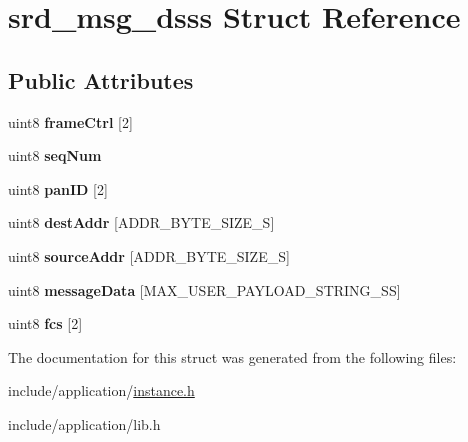 \hypertarget{structsrd__msg__dsss}{\section{srd\-\_\-msg\-\_\-dsss Struct Reference}
\label{structsrd__msg__dsss}
}
\subsection*{Public Attributes}
\begin{DoxyCompactItemize}
\item 
\hypertarget{structsrd__msg__dsss_aa8fe4f53ba63c69f62c8fb192f2786b4}{uint8 {\bfseries frame\-Ctrl} \mbox{[}2\mbox{]}}\label{structsrd__msg__dsss_aa8fe4f53ba63c69f62c8fb192f2786b4}

\item 
\hypertarget{structsrd__msg__dsss_a2bba6cb6f1eb110ee81204360e464139}{uint8 {\bfseries seq\-Num}}\label{structsrd__msg__dsss_a2bba6cb6f1eb110ee81204360e464139}

\item 
\hypertarget{structsrd__msg__dsss_a46eb7c581c5e39851590acfc0de65780}{uint8 {\bfseries pan\-I\-D} \mbox{[}2\mbox{]}}\label{structsrd__msg__dsss_a46eb7c581c5e39851590acfc0de65780}

\item 
\hypertarget{structsrd__msg__dsss_adea3cebad18e8b1c03828c67465577ba}{uint8 {\bfseries dest\-Addr} \mbox{[}A\-D\-D\-R\-\_\-\-B\-Y\-T\-E\-\_\-\-S\-I\-Z\-E\-\_\-\-S\mbox{]}}\label{structsrd__msg__dsss_adea3cebad18e8b1c03828c67465577ba}

\item 
\hypertarget{structsrd__msg__dsss_a4f0e2765b0052f0bb4cb81183cea453d}{uint8 {\bfseries source\-Addr} \mbox{[}A\-D\-D\-R\-\_\-\-B\-Y\-T\-E\-\_\-\-S\-I\-Z\-E\-\_\-\-S\mbox{]}}\label{structsrd__msg__dsss_a4f0e2765b0052f0bb4cb81183cea453d}

\item 
\hypertarget{structsrd__msg__dsss_ad79cad0d5570f8197185866b23f7e099}{uint8 {\bfseries message\-Data} \mbox{[}M\-A\-X\-\_\-\-U\-S\-E\-R\-\_\-\-P\-A\-Y\-L\-O\-A\-D\-\_\-\-S\-T\-R\-I\-N\-G\-\_\-\-S\-S\mbox{]}}\label{structsrd__msg__dsss_ad79cad0d5570f8197185866b23f7e099}

\item 
\hypertarget{structsrd__msg__dsss_a3505e43275522a97e0348caa39adba21}{uint8 {\bfseries fcs} \mbox{[}2\mbox{]}}\label{structsrd__msg__dsss_a3505e43275522a97e0348caa39adba21}

\end{DoxyCompactItemize}


The documentation for this struct was generated from the following files\-:\begin{DoxyCompactItemize}
\item 
include/application/\hyperlink{instance_8h}{instance.\-h}\item 
include/application/lib.\-h\end{DoxyCompactItemize}
